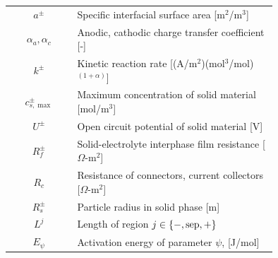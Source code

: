 \documentclass[12pt]{article}
\providecommand{\sep}{\ensuremath{\rm{sep}}}
\begin{document}
\begin{table}[h]
\begin{center}
\begin{tabular}{c | p{0.75\linewidth}}
$a^{\pm}$ & Specific interfacial surface area [m$^{2}$/m$^{3}$] \\
$\alpha_{a}, \alpha_{c}$ & Anodic, cathodic charge transfer coefficient [-] \\
$k^{\pm}$ & Kinetic reaction rate [(A/m$^{2}$)(mol$^{3}$/mol)$^{(1+\alpha)}$] \\
$c_{s,\max}^{\pm}$ & Maximum concentration of solid material [mol/m$^{3}$] \\
$U^{\pm}$ & Open circuit potential of solid material [V] \\
$R_{f}^{\pm}$ & Solid-electrolyte interphase film resistance [$\Omega$-m$^{2}$]\\
$R_{c}$ & Resistance of connectors, current collectors [$\Omega$-m$^{2}$]\\
$R_{s}^{\pm}$ & Particle radius in solid phase [m]\\
$L^{j}$ & Length of region $j \in \{-,\sep,+\}$ \\
$E_\psi$ & Activation energy of parameter $\psi$, [J/mol] \\
\hline \hline
\end{tabular}
\end{center}
\label{tbl:nomenclature}
\end{table}%


\footnotesize

\end{document}
